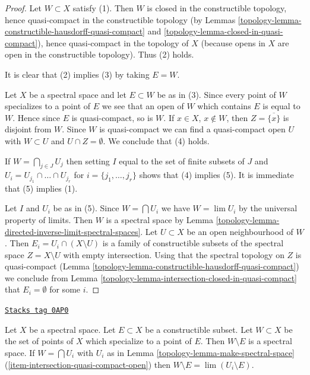 \begin{proof}

Let $W \subset X$ satisfy (1). Then $W$ is closed in the constructible
topology, hence quasi-compact in the constructible topology (by
Lemmas \ref{topology-lemma-constructible-hausdorff-quasi-compact} and
\ref{topology-lemma-closed-in-quasi-compact}), hence quasi-compact in the topology
of $X$ (because opens in $X$ are open in the constructible topology). Thus
(2) holds.

\medskip\noindent
It is clear that (2) implies (3) by taking $E = W$.

\medskip\noindent
Let $X$ be a spectral space and let $E \subset W$ be as in (3).
Since every point of $W$ specializes to a point of $E$ we see that
an open of $W$ which contains $E$ is equal to $W$. Hence since $E$
is quasi-compact, so is $W$.
If $x \in X$, $x \not \in W$, then $Z = \overline{\{x\}}$ is
disjoint from $W$. Since $W$ is quasi-compact we can find a
quasi-compact open $U$ with $W \subset U$ and $U \cap Z = \emptyset$.
We conclude that (4) holds.

\medskip\noindent
If $W = \bigcap_{j \in J} U_j$ then setting $I$ equal to the set of
finite subsets of $J$ and $U_i = U_{j_1} \cap \ldots \cap U_{j_r}$
for $i = \{j_1, \ldots, j_r\}$ shows that (4) implies (5). It is immediate
that (5) implies (1).

\medskip\noindent
Let $I$ and $U_i$ be as in (5).
Since $W = \bigcap U_i$ we have $W = \lim U_i$ by the universal property
of limits. Then $W$ is a spectral space by
Lemma \ref{topology-lemma-directed-inverse-limit-spectral-spaces}.
Let $U \subset X$ be an open neighbourhood of $W$.
Then $E_i = U_i \cap (X \setminus U)$ is a family of constructible
subsets of the spectral space $Z = X \setminus U$
with empty intersection. Using that the spectral topology on $Z$
is quasi-compact (Lemma \ref{topology-lemma-constructible-hausdorff-quasi-compact})
we conclude from
Lemma \ref{topology-lemma-intersection-closed-in-quasi-compact}
that $E_i = \emptyset$ for some $i$.
\end{proof}

\begin{lemma}
\label{topology-lemma-make-spectral-space-minus}
\href{https://stacks.math.columbia.edu/tag/0AP0}{\texttt{Stacks tag 0AP0}}

Let $X$ be a spectral space. Let $E \subset X$ be a constructible subset.
Let $W \subset X$ be the set of points of $X$ which specialize
to a point of $E$. Then $W \setminus E$ is a spectral space.
If $W = \bigcap U_i$ with $U_i$ as in
Lemma \ref{topology-lemma-make-spectral-space}
(\ref{item-intersection-quasi-compact-open})
then $W \setminus E = \lim (U_i \setminus E)$.
\end{lemma}

